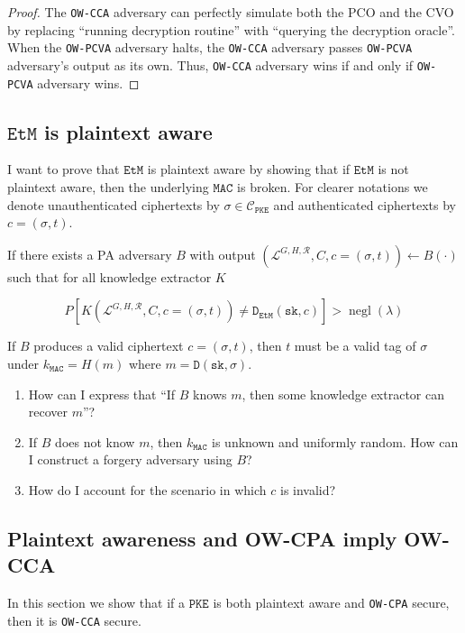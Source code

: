 \documentclass{article}
\newcommand{\monospace}{\texttt}
\newcommand{\pke}{\monospace{PKE}}
\newcommand{\decrypt}{\monospace{D}}
\newcommand{\etm}{\monospace{EtM}}  %
\newcommand{\mac}{\monospace{MAC}}
\newcommand{\sk}{\monospace{sk}}
\newcommand{\negl}[1]{\operatorname{negl}\left(#1\right)}
\begin{document}
\begin{proof}
    The \monospace{OW-CCA} adversary can perfectly simulate both the PCO and the CVO by replacing ``running decryption routine'' with ``querying the decryption oracle''. When the \monospace{OW-PCVA} adversary halts, the \monospace{OW-CCA} adversary passes \monospace{OW-PCVA} adversary's output as its own. Thus, \monospace{OW-CCA} adversary wins if and only if \monospace{OW-PCVA} adversary wins.
\end{proof}

\subsection{$\etm$ is plaintext aware}\label{sec:etm-is-pa}
I want to prove that $\etm$ is plaintext aware by showing that if $\etm$ is not plaintext aware, then the underlying $\mac$ is broken. For clearer notations we denote unauthenticated ciphertexts by $\sigma \in \mathcal{C}_\pke$ and authenticated ciphertexts by $c = (\sigma, t)$.

If there exists a PA adversary $B$ with output $(\mathcal{L}^{G, H, \mathcal{R}}, C, c=(\sigma, t)) \leftarrow B(\cdot)$ such that for all knowledge extractor $K$

\begin{equation*}
    P \left\lbrack
    K(\mathcal{L}^{G, H, \mathcal{R}}, C, c=(\sigma, t)) \neq \decrypt_\etm(\sk, c)
    \right\rbrack > \negl{\lambda}
\end{equation*}

If $B$ produces a valid ciphertext $c = (\sigma, t)$, then $t$ must be a valid tag of $\sigma$ under $k_\mac = H(m)$ where $m = \decrypt(\sk, \sigma)$.

\begin{enumerate}
    \item How can I express that ``If $B$ knows $m$, then some knowledge extractor can recover $m$''?
    \item If $B$ does not know $m$, then $k_\mac$ is unknown and uniformly random. How can I construct a forgery adversary using $B$?
    \item How do I account for the scenario in which $c$ is invalid?
\end{enumerate}

\subsection{Plaintext awareness and OW-CPA imply OW-CCA}\label{sec:pa-and-owcpa-imply-owcca}
In this section we show that if a $\pke$ is both plaintext aware and \monospace{OW-CPA} secure, then it is \monospace{OW-CCA} secure.
\end{document}
